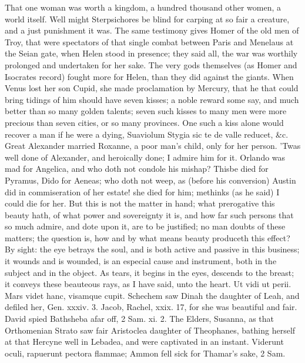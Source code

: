 {That one woman was worth a kingdom, a hundred thousand other women, a
world itself. Well might Sterpsichores be blind for carping at so
fair a creature, and a just punishment it was. The same testimony gives
Homer of the old men of Troy, that were spectators of that single
combat between Paris and Menelaus at the Seian gate, when Helen stood
in presence; they said all, the war was worthily prolonged and
undertaken for her sake. The very gods themselves (as Homer and
Isocrates record) fought more for Helen, than they did against
the giants. When Venus lost her son Cupid, she made proclamation
by Mercury, that he that could bring tidings of him should have seven
kisses; a noble reward some say, and much better than so many golden
talents; seven such kisses to many men were more precious than seven
cities, or so many provinces. One such a kiss alone would recover a man
if he were a dying, Suaviolum Stygia sic te de valle reducet, \&c.
Great Alexander married Roxanne, a poor man's child, only for her
person. 'Twas well done of Alexander, and heroically done; I
admire him for it. Orlando was mad for Angelica, and who doth not
condole his mishap? Thisbe died for Pyramus, Dido for Aeneas; who doth
not weep, as (before his conversion) Austin did in commiseration
of her estate! she died for him; methinks (as he said) I could die for
her.
But this is not the matter in hand; what prerogative this beauty hath,
of what power and sovereignty it is, and how far such persons that so
much admire, and dote upon it, are to be justified; no man doubts of
these matters; the question is, how and by what means beauty produceth
this effect? By sight: the eye betrays the soul, and is both active and
passive in this business; it wounds and is wounded, is an especial
cause and instrument, both in the subject and in the object. As
tears, it begins in the eyes, descends to the breast; it conveys these
beauteous rays, as I have said, unto the heart. Ut vidi ut perii.
Mars videt hanc, visamque cupit. Schechem saw Dinah the daughter
of Leah, and defiled her, Gen. xxxiv. 3. Jacob, Rachel, xxix. 17, for
she was beautiful and fair. David spied Bathsheba afar off, 2 Sam. xi.
2. The Elders, Susanna, as that Orthomenian Strato saw fair
Aristoclea daughter of Theophanes, bathing herself at that Hercyne well
in Lebadea, and were captivated in an instant. Viderunt oculi,
rapuerunt pectora flammae; Ammon fell sick for Thamar's sake, 2 Sam.
}
